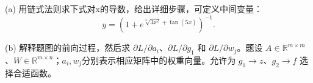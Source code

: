 (a) 用链式法则求下式对x的导数，给出详细步骤，可定义中间变量：
\[
y=\left(1+e^{\sqrt[3]{3x^2}+\tan(5x)}\right)^{-1}.
\]


(b) 解释题图的前向过程，然后求 \(\partial L/\partial a_i\)、\(\partial L/\partial g_1\) 和 \(\partial L/\partial w_j\)。题设 \(A\in\mathbb R^{m\times m}\)、\(W\in\mathbb R^{m\times n}\)；\(a_i,w_j\)分别表示相应矩阵中的权重向量。允许为 \(g_1\to z\)、\(g_2\to f\) 选择合适函数。
